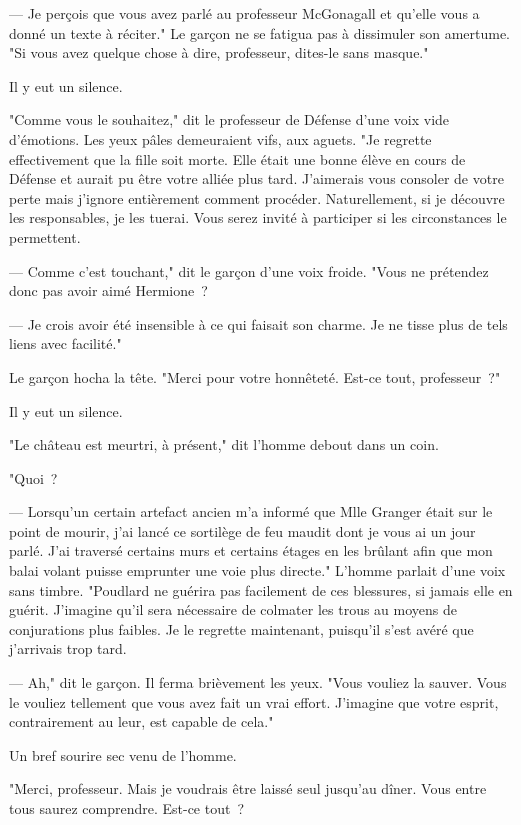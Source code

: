 --- Je perçois que vous avez parlé au professeur McGonagall et qu'elle vous a donné un texte à réciter." Le garçon ne se fatigua pas à dissimuler son amertume. "Si vous avez quelque chose à dire, professeur, dites-le sans masque."

Il y eut un silence.

"Comme vous le souhaitez," dit le professeur de Défense d'une voix vide d'émotions. Les yeux pâles demeuraient vifs, aux aguets. "Je regrette effectivement que la fille soit morte. Elle était une bonne élève en cours de Défense et aurait pu être votre alliée plus tard. J'aimerais vous consoler de votre perte mais j'ignore entièrement comment procéder. Naturellement, si je découvre les responsables, je les tuerai. Vous serez invité à participer si les circonstances le permettent.

--- Comme c'est touchant," dit le garçon d'une voix froide. "Vous ne prétendez donc pas avoir aimé Hermione~?

--- Je crois avoir été insensible à ce qui faisait son charme. Je ne tisse plus de tels liens avec facilité."

Le garçon hocha la tête. "Merci pour votre honnêteté. Est-ce tout, professeur~?"

Il y eut un silence.

"Le château est meurtri, à présent," dit l'homme debout dans un coin.

"Quoi~?

--- Lorsqu'un certain artefact ancien m'a informé que Mlle Granger était sur le point de mourir, j'ai lancé ce sortilège de feu maudit dont je vous ai un jour parlé. J'ai traversé certains murs et certains étages en les brûlant afin que mon balai volant puisse emprunter une voie plus directe." L'homme parlait d'une voix sans timbre. "Poudlard ne guérira pas facilement de ces blessures, si jamais elle en guérit. J'imagine qu'il sera nécessaire de colmater les trous au moyens de conjurations plus faibles. Je le regrette maintenant, puisqu'il s'est avéré que j'arrivais trop tard.

--- Ah," dit le garçon. Il ferma brièvement les yeux. "Vous vouliez la sauver. Vous le vouliez tellement que vous avez fait un vrai effort. J'imagine que votre esprit, contrairement au leur, est capable de cela."

Un bref sourire sec venu de l'homme.

"Merci, professeur. Mais je voudrais être laissé seul jusqu'au dîner. Vous entre tous saurez comprendre. Est-ce tout~?

